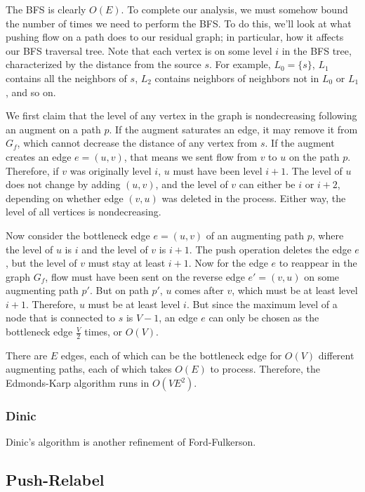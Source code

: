 The BFS is clearly $O(E)$. To complete our analysis, we must somehow bound the number of times we need to perform the BFS. To do this, we'll look at what pushing flow on a path does to our residual graph; in particular, how it affects our BFS traversal tree. Note that each vertex is on some level $i$ in the BFS tree, characterized by the distance from the source $s$. For example, $L_0 = \{s\}$, $L_1$ contains all the neighbors of $s$, $L_2$ contains neighbors of neighbors not in $L_0$ or $L_1$, and so on.

We first claim that the level of any vertex in the graph is nondecreasing following an augment on a path $p$. If the augment saturates an edge, it may remove it from $G_f$, which cannot decrease the distance of any vertex from $s$. If the augment creates an edge $e=(u,v)$, that means we sent flow from $v$ to $u$ on the path $p$. Therefore, if $v$ was originally level $i$, $u$ must have been level $i+1$. The level of $u$ does not change by adding $(u,v)$, and the level of $v$ can either be $i$ or $i+2$, depending on whether edge $(v,u)$ was deleted in the process. Either way, the level of all vertices is nondecreasing.

Now consider the bottleneck edge $e=(u,v)$ of an augmenting path $p$, where the level of $u$ is $i$ and the level of $v$ is $i+1$. The push operation deletes the edge $e$, but the level of $v$ must stay at least $i+1$. Now for the edge $e$ to reappear in the graph $G_f$, flow must have been sent on the reverse edge $e'=(v,u)$ on some augmenting path $p'$. But on path $p'$, $u$ comes after $v$, which must be at least level $i+1$. Therefore, $u$ must be at least level $i$. But since the maximum level of a node that is connected to $s$ is $V-1$, an edge $e$ can only be chosen as the bottleneck edge $\frac{V}{2}$ times, or $O(V)$.

There are $E$ edges, each of which can be the bottleneck edge for $O(V)$ different augmenting paths, each of which takes $O(E)$ to process. Therefore, the Edmonds-Karp algorithm runs in $O(VE^2)$.

\subsubsection{Dinic}

Dinic's algorithm is another refinement of Ford-Fulkerson.

\subsection{Push-Relabel}

